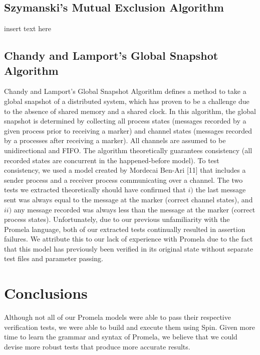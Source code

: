 \documentclass[12pt]{article}
\begin{document}
\begin{flushleft}
\subsection{Szymanski's Mutual Exclusion Algorithm}
insert text here

\subsection{Chandy and Lamport's Global Snapshot Algorithm}
Chandy and Lamport's Global Snapshot Algorithm defines a method to take a global snapshot of a distributed system, which has proven to be a challenge due to the absence of shared memory and a shared clock. In this algorithm, the global snapshot is determined by collecting all process states (messages recorded by a given process prior to receiving a marker) and channel states (messages recorded by a processes after receiving a marker). All channels are assumed to be unidirectional and FIFO. The algorithm theoretically guarantees consistency (all recorded states are concurrent in the happened-before model). To test consistency, we used a model created by Mordecai Ben-Ari [11] that includes a sender process and a receiver process communicating over a channel. The two tests we extracted theoretically should have confirmed that $i)$ the last message sent was always equal to the message at the marker (correct channel states), and $ii)$ any message recorded was always less than the message at the marker (correct process states). Unfortunately, due to our previous unfamiliarity with the Promela language, both of our extracted tests continually resulted in assertion failures. We attribute this to our lack of experience with Promela due to the fact that this model has previously been verified in its original state without separate test files and parameter passing.

\section{Conclusions}
Although not all of our Promela models were able to pass their respective verification tests, we were able to build and execute them using Spin. Given more time to learn the grammar and syntax of Promela, we believe that we could devise more robust tests that produce more accurate results.


\end{flushleft}
\end{document}

